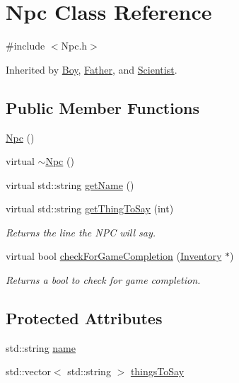 \hypertarget{class_npc}{}\section{Npc Class Reference}
\label{class_npc}


{\ttfamily \#include $<$Npc.\+h$>$}



Inherited by \mbox{\hyperlink{class_boy}{Boy}}, \mbox{\hyperlink{class_father}{Father}}, and \mbox{\hyperlink{class_scientist}{Scientist}}.

\subsection*{Public Member Functions}
\begin{DoxyCompactItemize}
\item 
\mbox{\hyperlink{class_npc_a748bee1d096f0dc38a80f2db64186644}{Npc}} ()
\item 
virtual \mbox{\hyperlink{class_npc_aed228b9aadbc7e1fddfc10395713a932}{$\sim$\+Npc}} ()
\item 
virtual std\+::string \mbox{\hyperlink{class_npc_a93f51feaa226543914f1cc0bc4cef1f6}{get\+Name}} ()
\item 
virtual std\+::string \mbox{\hyperlink{class_npc_a4dcac5b79963771805597411e819cd11}{get\+Thing\+To\+Say}} (int)
\begin{DoxyCompactList}\small\item\em Returns the line the N\+PC will say. \end{DoxyCompactList}\item 
virtual bool \mbox{\hyperlink{class_npc_aa1f04e3560c27e1770696fd3e7eb0c95}{check\+For\+Game\+Completion}} (\mbox{\hyperlink{class_inventory}{Inventory}} $\ast$)
\begin{DoxyCompactList}\small\item\em Returns a bool to check for game completion. \end{DoxyCompactList}\end{DoxyCompactItemize}
\subsection*{Protected Attributes}
\begin{DoxyCompactItemize}
\item 
std\+::string \mbox{\hyperlink{class_npc_a4136960f515b8318c602e8eb75b6163a}{name}}
\item 
std\+::vector$<$ std\+::string $>$ \mbox{\hyperlink{class_npc_a96b8dbc019c68d7fe8eb377dcb8f9b9f}{things\+To\+Say}}
\end{DoxyCompactItemize}


